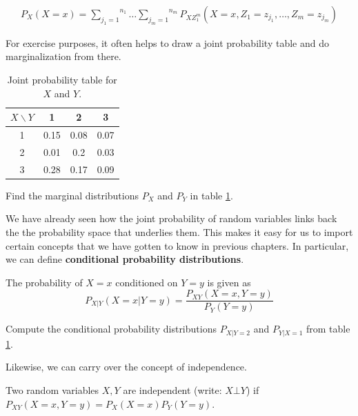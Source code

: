 \documentclass[a4paper,11pt,leqno]{report}
\begin{document}
\begin{align}
P_{X}(X=x) = \overset{n_{1}}{\underset{j_{1}=1}{\sum}}\ldots \overset{n_{m}}{\underset{j_{m}=1}{\sum}} 
P_{XZ_{1}^{m}}(X=x,Z_{1}=z_{j_{1}}, \ldots, Z_{m}=z_{j_{m}})
\end{align}

For exercise purposes, it often helps to draw a joint probability table and do marginalization from there.

\begin{table}
\center
\begin{tabular}{|c|c|c|c|}
\hline
$X\backslash Y$	& 1		& 2		& 3		\\
\hline
1				& 0.15	& 0.08	& 0.07	\\
2				& 0.01	& 0.2	& 0.03	\\	
3				& 0.28	& 0.17	& 0.09	\\
\hline
\end{tabular}
\caption{Joint probability table for $ X $ and $ Y $.}
\label{jointTable}
\end{table}

\begin{Exercise}
Find the marginal distributions $ P_{X} $ and $ P_{Y} $ in table \ref{jointTable}.
\end{Exercise}

We have already seen how the joint probability of random variables links back the the probability space that underlies them.
This makes it easy for us to import certain concepts that we have gotten to know in previous chapters. In particular, we can
define \textbf{conditional probability distributions}.

\begin{Definition}
The probability of $ X = x $ conditioned on $ Y=y $ is given as
$$ P_{X|Y}(X=x|Y=y) = \dfrac{P_{XY}(X=x, Y=y)}{P_{Y}(Y=y)} $$
\end{Definition} 

\begin{Exercise}
Compute the conditional probability distributions $ P_{X|Y=2} $ and $ P_{Y|X=1} $ from table \ref{jointTable}.
\end{Exercise}

Likewise, we can carry over the concept of independence.

\begin{Definition}
Two random variables $ X,Y $ are independent (write: $ X \bot Y $) if $ P_{XY}(X=x, Y=y) = P_{X}(X=x)P_{Y}(Y=y) $.
\end{Definition}
\end{document}
